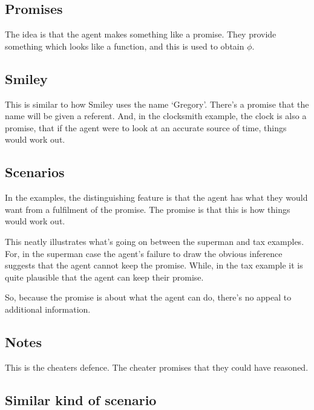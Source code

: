 \documentclass[10pt]{article}
\begin{document}
\subsection{Promises}
\label{sec:promises}

The idea is that the agent makes something like a promise.
They provide something which looks like a function, and this is used to obtain \(\phi\).

\subsection{Smiley}
\label{sec:smiley}

This is similar to how Smiley uses the name `Gregory'.
There's a promise that the name will be given a referent.
And, in the clocksmith example, the clock is also a promise, that if the agent were to look at an accurate source of time, things would work out.

\subsection{Scenarios}
\label{sec:scenarios-1}

In the examples, the distinguishing feature is that the agent has what they would want from a fulfilment of the promise.
The promise is that this is how things would work out.

This neatly illustrates what's going on between the superman and tax examples.
For, in the superman case the agent's failure to draw the obvious inference suggests that the agent cannot keep the promise.
While, in the tax example it is quite plausible that the agent can keep their promise.

So, because the promise is about what the agent can do, there's no appeal to additional information.

\subsection{Notes}
\label{sec:notes}

\begin{note}
  This is the cheaters defence.
  The cheater promises that they could have reasoned.
\end{note}


\subsection{Similar kind of scenario}
\label{sec:simil-kind-scen}
\end{document}
